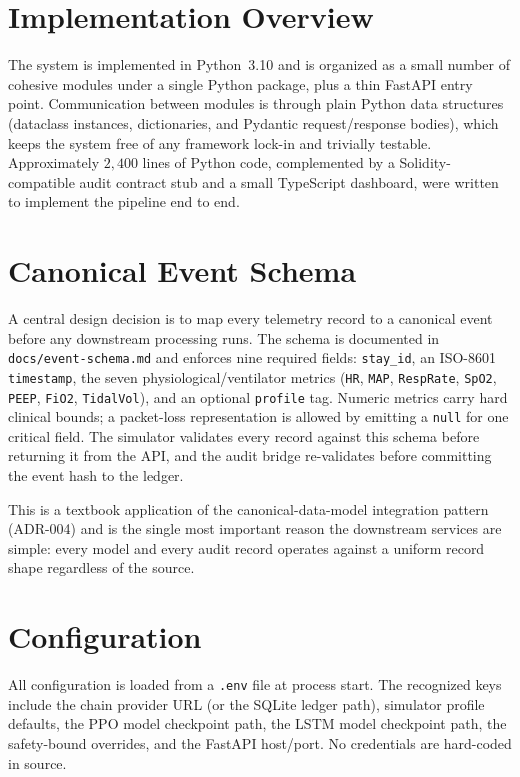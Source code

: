 \documentclass[12pt,a4paper,oneside]{report}
\begin{document}
\section{Implementation Overview}
The system is implemented in Python~3.10 and is organized as a small number of cohesive modules under a single Python package, plus a thin FastAPI entry point. Communication between modules is through plain Python data structures (dataclass instances, dictionaries, and Pydantic request/response bodies), which keeps the system free of any framework lock-in and trivially testable. Approximately $2{,}400$ lines of Python code, complemented by a Solidity-compatible audit contract stub and a small TypeScript dashboard, were written to implement the pipeline end to end.

\section{Canonical Event Schema}
A central design decision is to map every telemetry record to a canonical event before any downstream processing runs. The schema is documented in \texttt{docs/event-schema.md} and enforces nine required fields: \texttt{stay\_id}, an ISO-8601 \texttt{timestamp}, the seven physiological/ventilator metrics (\texttt{HR}, \texttt{MAP}, \texttt{RespRate}, \texttt{SpO2}, \texttt{PEEP}, \texttt{FiO2}, \texttt{TidalVol}), and an optional \texttt{profile} tag. Numeric metrics carry hard clinical bounds; a packet-loss representation is allowed by emitting a \texttt{null} for one critical field. The simulator validates every record against this schema before returning it from the API, and the audit bridge re-validates before committing the event hash to the ledger.

This is a textbook application of the canonical-data-model integration pattern (ADR-004) and is the single most important reason the downstream services are simple: every model and every audit record operates against a uniform record shape regardless of the source.

\section{Configuration}
All configuration is loaded from a \texttt{.env} file at process start. The recognized keys include the chain provider URL (or the SQLite ledger path), simulator profile defaults, the PPO model checkpoint path, the LSTM model checkpoint path, the safety-bound overrides, and the FastAPI host/port. No credentials are hard-coded in source.
\end{document}
